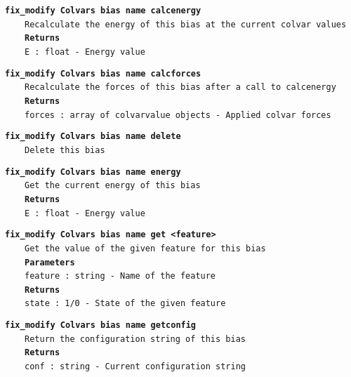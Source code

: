 \begin{mdexampleinput}{}
\texttt{\textbf{fix\_modify Colvars bias name calcenergy}}
\\
\-~~~~\texttt{Recalculate the energy of this bias at the current colvar values}
\\
\-~~~~\texttt{\textbf{Returns}}
\\
\-~~~~\texttt{E : float - Energy value}
\end{mdexampleinput}
\begin{mdexampleinput}{}
\texttt{\textbf{fix\_modify Colvars bias name calcforces}}
\\
\-~~~~\texttt{Recalculate the forces of this bias after a call to calcenergy}
\\
\-~~~~\texttt{\textbf{Returns}}
\\
\-~~~~\texttt{forces : array of colvarvalue objects - Applied colvar forces}
\end{mdexampleinput}
\begin{mdexampleinput}{}
\texttt{\textbf{fix\_modify Colvars bias name delete}}
\\
\-~~~~\texttt{Delete this bias}
\end{mdexampleinput}
\begin{mdexampleinput}{}
\texttt{\textbf{fix\_modify Colvars bias name energy}}
\\
\-~~~~\texttt{Get the current energy of this bias}
\\
\-~~~~\texttt{\textbf{Returns}}
\\
\-~~~~\texttt{E : float - Energy value}
\end{mdexampleinput}
\begin{mdexampleinput}{}
\texttt{\textbf{fix\_modify Colvars bias name get <feature>}}
\\
\-~~~~\texttt{Get the value of the given feature for this bias}
\\
\-~~~~\texttt{\textbf{Parameters}}
\\
\-~~~~\texttt{feature : string - Name of the feature}
\\
\-~~~~\texttt{\textbf{Returns}}
\\
\-~~~~\texttt{state : 1/0 - State of the given feature}
\end{mdexampleinput}
\begin{mdexampleinput}{}
\texttt{\textbf{fix\_modify Colvars bias name getconfig}}
\\
\-~~~~\texttt{Return the configuration string of this bias}
\\
\-~~~~\texttt{\textbf{Returns}}
\\
\-~~~~\texttt{conf : string - Current configuration string}
\end{mdexampleinput}
